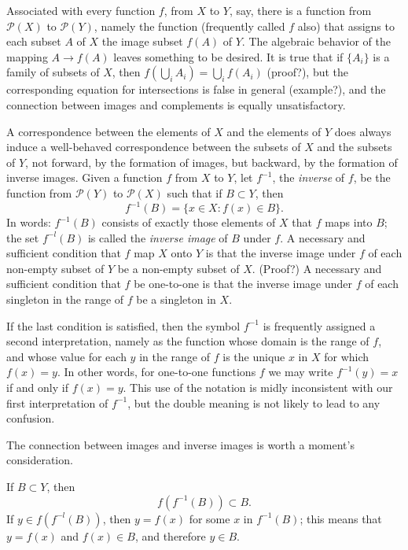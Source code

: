 Associated with every function $f$, from $X$ to $Y$, say, there is a function from $\mathcal{P}(X)$ to $\mathcal{P}(Y)$, namely the function (frequently called $f$ also) that assigns to each subset $A$ of $X$ the image subset $f(A)$ of $Y$. The algebraic behavior of the mapping $A \rightarrow f(A)$ leaves something to be desired. It is true that if $ \{ A_{i} \} $ is a family of subsets of $X$, then $f( \bigcup_{i} A_{i} ) = \bigcup_{i} f( A_{i} )$ (proof?), but the corresponding equation for intersections is false in general (example?), and the connection between images and complements is equally unsatisfactory. 

A correspondence between the elements of $X$ and the elements of $Y$ does always induce a well-behaved correspondence between the subsets of $X$ and the subsets of $Y$, not forward, by the formation of images, but backward, by the formation of inverse images. Given a function $f$ from $X$ to $Y$, let $f^{-1}$, the \textit{inverse} of $f$, be the function from $\mathcal{P}(Y)$ to $\mathcal{P}(X)$ such that if $B \subset Y$, then
\begin{equation*}
f^{-1}(B) = \{ x \in X : f(x) \in B \} .
\end{equation*}
In words: $f^{-1}(B)$ consists of exactly those elements of $X$ that $f$ maps into $B$; the set $f^{-l}(B)$ is called the \textit{inverse image} of $B$ under $f$. A necessary and sufficient condition that $f$ map $X$ onto $Y$ is that the inverse image under $f$ of each non-empty subset of $Y$ be a non-empty subset of $X$. (Proof?) A necessary and sufficient condition that $f$ be one-to-one is that the inverse image under $f$ of each singleton in the range of $f$ be a singleton in $X$. 

If the last condition is satisfied, then the symbol $f^{-1}$ is frequently assigned a second interpretation, namely as the function whose domain is the range of $f$, and whose value for each $y$ in the range of $f$ is the unique $x$ in $X$ for which $f(x) = y$. In other words, for one-to-one functions $f$ we may write $f^{-1}(y) = x$ if and only if $f(x) = y$. This use of the notation is midly inconsistent with our first interpretation of $f^{-1}$, but the double meaning is not likely to lead to any confusion.

The connection between images and inverse images is worth a moment's consideration. 

If $B \subset Y$, then
\begin{equation*} 
f(f^{-1}(B)) \subset B.
\end{equation*}
 If $y \in f(f^{-l}(B))$, then $y = f(x)$ for some $x$ in $f^{-1}(B)$; this means that $y = f(x)$ and $f(x) \in B$, and therefore $y \in B$. 

